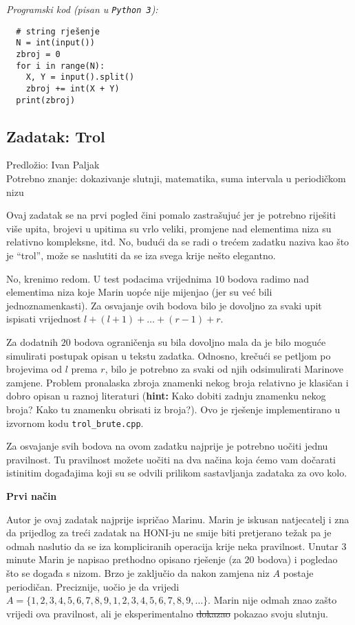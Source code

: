 \documentclass[a4paper]{article}
\begin{document}
\textit{Programski kod (pisan u \texttt{Python 3}):}

\vspace{-2ex}
\begin{verbatim}
  # string rješenje
  N = int(input())
  zbroj = 0
  for i in range(N):
    X, Y = input().split()
    zbroj += int(X + Y)
  print(zbroj)
\end{verbatim}

\clearpage

\subsection*{Zadatak: Trol}
\textsf{Predložio: Ivan Paljak}\\
\textsf{Potrebno znanje: dokazivanje slutnji, matematika, suma intervala u
periodičkom nizu}

Ovaj zadatak se na prvi pogled čini pomalo zastrašujuć jer je potrebno riješiti
više upita, brojevi u upitima su vrlo veliki, promjene nad elementima niza su
relativno kompleksne, itd. No, budući da se radi o trećem zadatku naziva kao što
je ``trol'', može se naslutiti da se iza svega krije nešto elegantno.

No, krenimo redom. U test podacima vrijednima $10$ bodova radimo nad elementima
niza koje Marin uopće nije mijenjao (jer su već bili jednoznamenkasti).
Za osvajanje ovih bodova bilo je dovoljno za svaki upit ispisati vrijednost
$l + (l + 1) + … + (r - 1) + r$.

Za dodatnih $20$ bodova ograničenja su bila dovoljno mala da je bilo moguće
simulirati postupak opisan u tekstu zadatka. Odnosno, krečući se petljom po
brojevima od $l$ prema $r$, bilo je potrebno za svaki od njih odsimulirati
Marinove zamjene. Problem pronalaska zbroja znamenki nekog broja relativno je
klasičan i dobro opisan u raznoj literaturi (\textbf{hint:} Kako dobiti zadnju
znamenku nekog broja? Kako tu znamenku obrisati iz broja?). Ovo je rješenje
implementirano u izvornom kodu \texttt{trol\_brute.cpp}.

Za osvajanje svih bodova na ovom zadatku najprije je potrebno uočiti jednu
pravilnost. Tu pravilnost možete uočiti na dva načina koja ćemo vam dočarati
istinitim događajima koji su se odvili prilikom sastavljanja zadataka za ovo
kolo.

\textbf{Prvi način}

Autor je ovaj zadatak najprije ispričao Marinu. Marin je iskusan natjecatelj i
zna da prijedlog za treći zadatak na HONI-ju ne smije biti pretjerano težak pa
je odmah naslutio da se iza kompliciranih operacija krije neka pravilnost.
Unutar $3$ minute Marin je napisao prethodno opisano rješenje (za $20$ bodova) i
pogledao što se događa s nizom. Brzo je zaključio da nakon zamjena niz $A$
postaje periodičan. Preciznije, uočio je da vrijedi
$A = \{1, 2, 3, 4, 5, 6, 7, 8, 9, 1, 2, 3, 4, 5, 6, 7, 8, 9, \dots\}$. Marin
nije odmah znao zašto vrijedi ova pravilnost, ali je eksperimentalno
\sout{dokazao} pokazao svoju slutnju.
\end{document}
